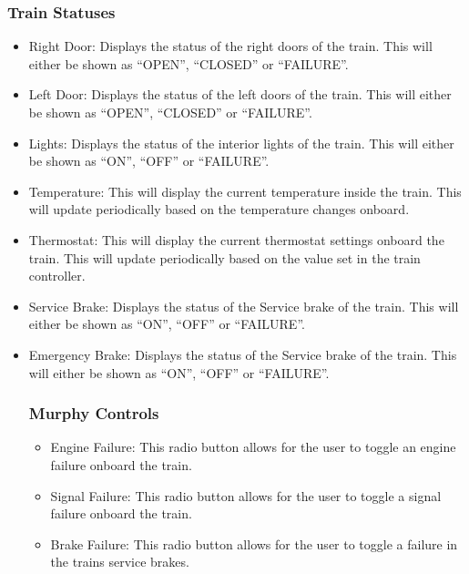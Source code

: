 	\subsubsection{Train Statuses}
		\begin{itemize}
			\item Right Door:  Displays the status of the right doors of the train. This will either be shown as “OPEN”, “CLOSED” or “FAILURE”.
			\item Left Door:  Displays the status of the left doors of the train. This will either be shown as “OPEN”, “CLOSED” or “FAILURE”.
			\item Lights:  Displays the status of the interior lights of the train. This will either be shown as “ON”, “OFF” or “FAILURE”.
			\item Temperature: This will display the current temperature inside the train. This will update periodically based on the temperature changes onboard.
			\item Thermostat: This will display the current thermostat settings onboard the train. This will update periodically based on the value set in the train controller.
			\item Service Brake:  Displays the status of the Service brake of the train. This will either be shown as “ON”, “OFF” or “FAILURE”.
			\item Emergency Brake:  Displays the status of the Service brake of the train. This will either be shown as “ON”, “OFF” or “FAILURE”.
	\subsubsection{Murphy Controls}
		\begin{itemize}
			\item Engine Failure: This radio button allows for the user to toggle an engine failure onboard the train.  
			\item Signal Failure: This radio button allows for the user to toggle a signal failure onboard the train. 
			\item Brake Failure: This radio button allows for the user to toggle a failure in the trains service brakes.
		\end{itemize}


\end{itemize}
